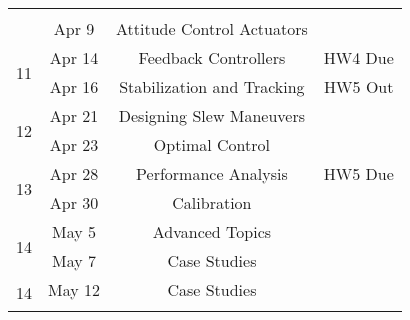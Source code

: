 \documentclass[11pt,letterpaper]{article}
\begin{document}
\begin{tabular}{c|c|c|c}
         &  \\
	 & Apr 9 & Attitude Control Actuators &   \\
	 \hline
	\multirow{2}{*}{11}  & Apr 14 & Feedback Controllers
         & HW4 Due \\
	 & Apr 16 & Stabilization and Tracking &  HW5 Out \\
	 \hline
	\multirow{2}{*}{12}  & Apr 21 & Designing Slew Maneuvers 
         &   \\
	 & Apr 23 & Optimal Control &   \\
	 \hline
	\multirow{2}{*}{13}  & Apr 28 & Performance Analysis
         & HW5 Due \\
	 & Apr 30 & Calibration &   \\
	 \hline
	\multirow{2}{*}{14}  & May 5 & Advanced Topics
         &  \\
	 & May 7 & Case Studies &   \\
	 \hline
	\multirow{2}{*}{14}  & May 12 &
        Case Studies &  \\
	 &  &  &   \\
\end{tabular}
\end{document}
